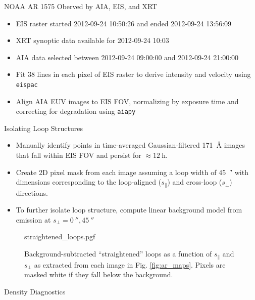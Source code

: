 \documentclass[final]{beamer}
\newlength{\colwidth}
\begin{document}
\begin{frame}[t]
\begin{columns}[t]
\begin{column}{\colwidth}
\begin{block}{NOAA AR 1575 Oberved by AIA, EIS, and XRT}
    \begin{itemize}
      \item EIS raster started 2012-09-24 10:50:26 and ended 2012-09-24 13:56:09
      \item XRT synoptic data available for 2012-09-24 10:03
      \item AIA data selected between 2012-09-24 09:00:00 and 2012-09-24 21:00:00
      \item Fit 38 lines in each pixel of EIS raster to derive intensity and velocity using \texttt{eispac} \citep{weberg_eispac_2023}
      \item Align AIA EUV images to EIS FOV, normalizing by exposure time and correcting for degradation using \texttt{aiapy} \citep{barnes_aiapy_2020} 
    \end{itemize}

  \end{block}

  \begin{block}{Isolating Loop Structures}
    \begin{itemize}
      \item Manually identify points in time-averaged Gaussian-filtered \SI{171}{\angstrom} images that fall within EIS FOV and persist for $\approx\SI{12}{\hour}$.
      \item Create 2D pixel mask from each image assuming a loop width of \SI{45}{\arcsecond} with dimensions corresponding to the loop-aligned ($s_\parallel$) and cross-loop ($s_\perp$) directions.
      \item To further isolate loop structure, compute linear background model from emission at $s_\perp=\SI{0}{\arcsecond},\SI{45}{\arcsecond}$
    \end{itemize}
    \begin{figure}[H]
      \centering
      {straightened_loops.pgf}
      \caption{Background-subtracted ``straightened'' loops as a function of $s_\parallel$ and $s_\perp$ as extracted from each image in Fig. \ref{fig:ar_maps}. Pixels are masked white if they fall below the background.}
      \label{fig:straightened_loops}
    \end{figure}

  \end{block}
  \vspace{-10px}
  \begin{block}{Density Diagnostics}


\end{block}
\end{column}
\end{columns}
\end{frame}
\end{document}
